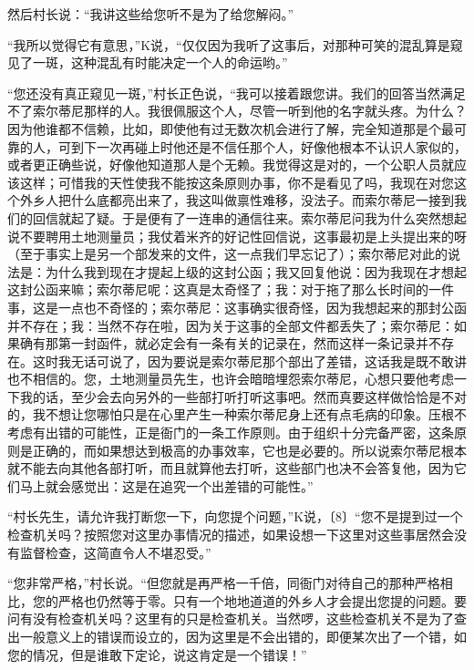 \documentclass[12pt,a4paper]{article}
\begin{document}
然后村长说：“我讲这些给您听不是为了给您解闷。”



“我所以觉得它有意思，”K说，“仅仅因为我听了这事后，对那种可笑的混乱算是窥见了一斑，这种混乱有时能决定一个人的命运哟。”



“您还没有真正窥见一斑，”村长正色说，“我可以接着跟您讲。我们的回答当然满足不了索尔蒂尼那样的人。我很佩服这个人，尽管一听到他的名字就头疼。为什么？因为他谁都不信赖，比如，即使他有过无数次机会进行了解，完全知道那是个最可靠的人，可到下一次再碰上时他还是不信任那个人，好像他根本不认识人家似的，或者更正确些说，好像他知道那人是个无赖。我觉得这是对的，一个公职人员就应该这样；可惜我的天性使我不能按这条原则办事，你不是看见了吗，我现在对您这个外乡人把什么底都亮出来了，我这叫做禀性难移，没法子。而索尔蒂尼一接到我们的回信就起了疑。于是便有了一连串的通信往来。索尔蒂尼问我为什么突然想起说不要聘用土地测量员；我仗着米齐的好记性回信说，这事最初是上头提出来的呀（至于事实上是另一个部发来的文件，这一点我们早忘记了）；索尔蒂尼对此的说法是：为什么我到现在才提起上级的这封公函；我又回复他说：因为我现在才想起这封公函来嘛；索尔蒂尼呢：这真是太奇怪了；我：对于拖了那么长时间的一件事，这是一点也不奇怪的；索尔蒂尼：这事确实很奇怪，因为我想起来的那封公函并不存在；我：当然不存在啦，因为关于这事的全部文件都丢失了；索尔蒂尼：如果确有那第一封函件，就必定会有一条有关的记录在，然而这样一条记录并不存在。这时我无话可说了，因为要说是索尔蒂尼那个部出了差错，这话我是既不敢讲也不相信的。您，土地测量员先生，也许会暗暗埋怨索尔蒂尼，心想只要他考虑一下我的话，至少会去向另外的一些部打听打听这事吧。然而真要这样做恰恰是不对的，我不想让您哪怕只是在心里产生一种索尔蒂尼身上还有点毛病的印象。压根不考虑有出错的可能性，正是衙门的一条工作原则。由于组织十分完备严密，这条原则是正确的，而如果想达到极高的办事效率，它也是必要的。所以说索尔蒂尼根本就不能去向其他各部打听，而且就算他去打听，这些部门也决不会答复他，因为它们马上就会感觉出：这是在追究一个出差错的可能性。”



“村长先生，请允许我打断您一下，向您提个问题，”K说，〔8〕“您不是提到过一个检查机关吗？按照您对这里办事情况的描述，如果设想一下这里对这些事居然会没有监督检查，这简直令人不堪忍受。”



“您非常严格，”村长说。“但您就是再严格一千倍，同衙门对待自己的那种严格相比，您的严格也仍然等于零。只有一个地地道道的外乡人才会提出您提的问题。要问有没有检查机关吗？这里有的只是检查机关。当然啰，这些检查机关不是为了查出一般意义上的错误而设立的，因为这里是不会出错的，即便某次出了一个错，如您的情况，但是谁敢下定论，说这肯定是一个错误！”
\end{document}
